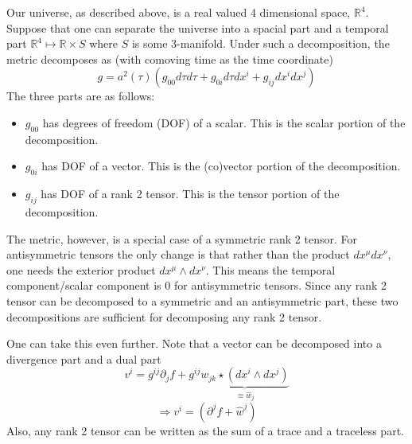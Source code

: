 Our universe, as described above, is a real valued 4 dimensional space, $\mathbb{R}^4$. Suppose that one can separate the universe into a spacial part and a temporal part $\mathbb{R}^4 \mapsto \mathbb{R} \times S$ where $S$ is some $3$-manifold. Under such a decomposition, the metric decomposes as (with comoving time as the time coordinate)
\begin{equation}
	g = a^2(\tau)\left( g_{00}d\tau d\tau + g_{0i}d\tau dx^{i} + g_{ij} dx^{i}dx^{j} \right)
\end{equation}
The three parts are as follows:
\begin{itemize}
    \item $g_{00}$ has degrees of freedom (DOF) of a scalar. This is the scalar portion of the decomposition.
    \item $g_{0i}$ has DOF of a vector. This is the (co)vector portion of the decomposition.
    \item $g_{ij}$ has DOF of a rank 2 tensor. This is the tensor portion of the decomposition.
\end{itemize}
The metric, however, is a special case of a symmetric rank 2 tensor. For antisymmetric tensors the only change is that rather than the product $dx^\mu dx^\nu$, one needs the exterior product $dx^\mu \wedge dx^\nu$. This means the temporal component/scalar component is 0 for antisymmetric tensors. Since any rank 2 tensor can be decomposed to a symmetric and an antisymmetric part, these two decompositions are sufficient for decomposing any rank 2 tensor. 

One can take this even further. Note that a vector can be decomposed into a divergence part and a dual part
\begin{equation} 
	v^i = g^{ij}\partial_j f + g^{ij} \underbrace{w_{jk}\star (dx^{i} \wedge dx^{j})}_{\equiv \hat{w}_j}
\end{equation}
\begin{equation}
	\Rightarrow v^i = (\partial^j f + \hat{w}^j)
\end{equation}
Also, any rank 2 tensor can be written as the sum of a trace and a traceless part.